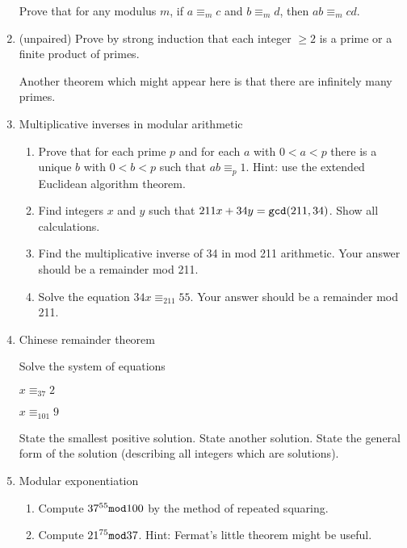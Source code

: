 \documentclass[12pt]{article}
\begin{document}
\begin{enumerate}
Prove that for any modulus $m$, if $a \equiv_m c$ and $b \equiv_m d$, then $ab \equiv_m cd$.

\newpage

\item  (unpaired)  Prove by strong induction that each integer $\geq 2$ is a prime or a finite product of primes.

Another theorem which might appear here is that there are infinitely many primes.

\newpage



\item  Multiplicative inverses in modular arithmetic

\begin{enumerate}

\item  Prove that for each prime $p$ and for each $a$ with $0 <a <p$ there is a unique $b$ with $0<b<p$ such that $ab \equiv_p 1$.  Hint:  use the extended Euclidean algorithm theorem.

\item  Find integers $x$ and $y$ such that $211x + 34y = {\tt gcd}(211,34)$.  Show all calculations.

\item  Find the multiplicative inverse of 34 in mod 211 arithmetic.  Your answer should be a remainder mod 211.

\item  Solve the equation $34x \equiv_{211} 55$.  Your answer should be a remainder mod 211.

\end{enumerate}

\newpage

\item  Chinese remainder theorem

Solve the system of equations

$x \equiv_{37} 2$

$x \equiv_{101} 9$

State the smallest positive solution.  State another solution.  State the general form of the solution (describing all integers which are solutions).

\newpage

\item Modular exponentiation

\begin{enumerate}

\item  Compute $37^{55} {\tt mod} 100$ by the method of repeated squaring.

\item  Compute $21^{75} {\tt mod} 37$.  Hint:  Fermat's little theorem might be useful.

\end{enumerate}


\newpage

\end{enumerate}
\end{document}
